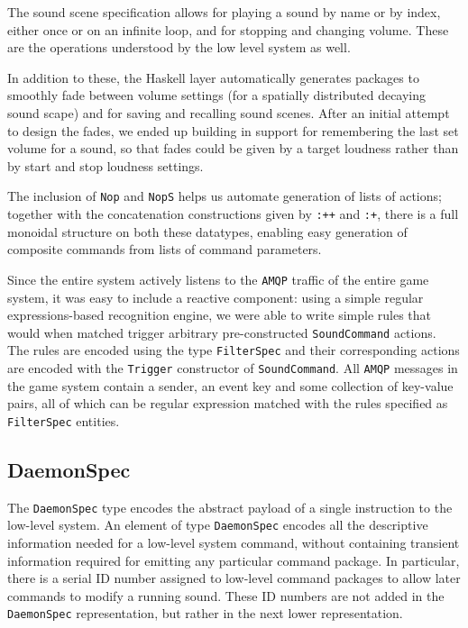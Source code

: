 The sound scene specification allows for playing a sound
by name or by index, either once or on an infinite loop, and for
stopping and changing volume. These are the operations understood by
the low level system as well.

In addition to these, the Haskell layer automatically generates
packages to smoothly fade between volume settings (for a spatially
distributed decaying sound scape) and for saving and recalling sound
scenes. After an initial attempt to design the fades, we ended up building
in support for remembering the last set volume for a sound, so that
fades could be given by a target loudness rather than by start and stop
loudness settings.

The inclusion of \texttt{Nop} and \texttt{NopS} helps us automate
generation of lists of actions; together with the concatenation
constructions given by \texttt{:++} and \texttt{:+}, there is a full
monoidal structure on both these datatypes, enabling easy generation
of composite commands from lists of command parameters. 

Since the entire system actively listens to the \texttt{AMQP} traffic of the
entire game system, it was easy to include a reactive component: using
a simple regular expressions-based recognition engine, we were able
to write simple rules that would when matched trigger arbitrary
pre-constructed \texttt{SoundCommand} actions. The rules are encoded
using the type \texttt{FilterSpec} and their corresponding actions are
encoded with the \texttt{Trigger} constructor of
\texttt{SoundCommand}. All \texttt{AMQP} messages in the game system contain a
sender, an event key and some collection of key-value pairs, all of
which can be regular expression matched with the rules specified as
\texttt{FilterSpec} entities.

\subsection{DaemonSpec}
\label{sec:daemonspec}

The \texttt{DaemonSpec} type encodes the abstract payload of a single
instruction to the low-level system. An element of type
\texttt{DaemonSpec} encodes all the descriptive information needed for
a low-level system command, without containing transient information
required for emitting any particular command package. In particular,
there is a serial ID number assigned to low-level command packages to
allow later commands to modify a running sound. These ID numbers are
not added in the \texttt{DaemonSpec} representation, but rather in the
next lower representation.

